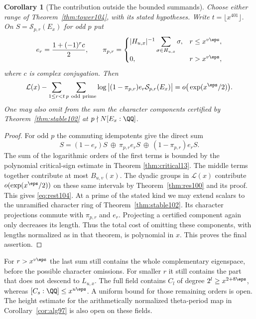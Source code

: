 \documentclass[a4paper,11pt]{article}
\newtheorem{corollary}[proposition]{Corollary}
\theoremstyle{definition}
\theoremstyle{remark}
\numberwithin{equation}{section}
\begin{document}
\begin{corollary}[The contribution outside the bounded summands]
\label{cor:rest104}
Choose either range of Theorem~\ref{thm:tower104}, with its
stated hypotheses. Write \(t=\lfloor x^{401}\rfloor\).
On \(S=\mathcal S_{p,r}(E_x)\) for odd \(p\) put
\[
 e_r=\frac{1+(-1)^r c}{2},\qquad
 \pi_{p,r}=
 \begin{cases}
 |H_{u,x}|^{-1}\displaystyle\sum_{\sigma\in H_{u,x}}\sigma,
                       & r\le x^{v\eps},\\
 0,                    & r>x^{v\eps},
 \end{cases}
\]
where \(c\) is complex conjugation. Then
\begin{equation}
 \mathcal L(x)-
 \sum_{1\le r<t}\sum_{p\ {\rm odd\ prime}}
   \log\big|(1-\pi_{p,r})e_r\mathcal S_{p,r}(E_x)\big|
             =o\big(\exp(x^\eps/2)\big).                 \label{eq:rest104}
\end{equation}
One may also omit from the sum the character components certified
by Theorem~\ref{thm:stable102} at \(p\nmid N[E_x:\QQ]\).
\end{corollary}
\begin{proof}
For odd \(p\) the commuting idempotents give the direct sum
\[
 S=(1-e_r)S\ \oplus\ \pi_{p,r}e_r S\
             \oplus\ (1-\pi_{p,r})e_r S.
\]
The sum of the logarithmic orders of the first terms is bounded
by the polynomial critical-sign estimate in
Theorem \ref{thm:critical13}.
The middle terms together contribute at most \(B_{u,v}(x)\).
The dyadic groups in \(\mathcal L(x)\) contribute
\(o(\exp(x^\eps/2))\) on these same intervals by
Theorem~\ref{thm:res100} and its proof. This gives
\eqref{eq:rest104}. At a prime of the stated kind we may
extend scalars to the unramified character ring of
Theorem~\ref{thm:stable102}. Its character projections commute
with \(\pi_{p,r}\) and \(e_r\). Projecting a certified component
again only decreases its length. Thus the total cost of
omitting these components, with lengths normalized as in that
theorem, is polynomial in \(x\). This proves the final assertion.
\end{proof}

For \(r>x^{v\eps}\) the last sum still contains the whole
complementary eigenspace, before the possible character omissions.
For smaller \(r\) it still contains the part that does not descend
to \(L_{u,x}\). The full field contains \(C_l\) of degree
\(2^l\ge x^{2+8\eps}\), whereas \([C_s:\QQ]\le x^{u\eps}\).
A uniform bound for those remaining orders is open. The height
estimate for the arithmetically normalized theta-period map
in Corollary~\ref{cor:alg97} is also open on these fields.
\end{document}
